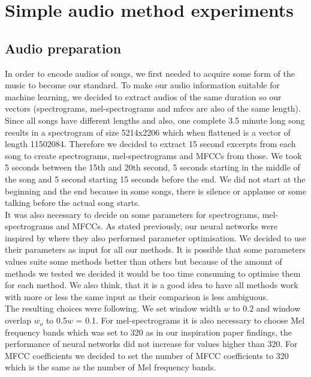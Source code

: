 \section{Simple audio method experiments}

\subsection{Audio preparation}\label{ssec:audio_prep}

In order to encode audios of songs, we first needed to acquire some form of the music to become our standard. To make our audio information suitable for machine learning, we decided to extract audios of the same duration so our vectors (spectrograms, mel-spectrograms and mfccs are also of the same length). Since all songs have different lengths and also, one complete 3.5 minute long song results in a spectrogram of size 5214x2206 which when flattened is a vector of length 11502084. Therefore we decided to extract 15 second excerpts from each song to create spectrograms, mel-spectrograms and MFCCs from those. We took 5 seconds between the 15th and 20th second, 5 seconds starting in the middle of the song and 5 second starting 15 seconds before the end. We did not start at the beginning and the end because in some songs, there is silence or applause or some talking before the actual song starts. \\

It was also necessary to decide on some parameters for spectrograms, mel-spectrograms and MFCCs. As stated previously, our neural networks were inspired by \cite{inproceedings_RNNs} where they also performed parameter optimisation. We decided to use their parameters as input for all our methods. It is possible that some parameters values suite some methods better than others but because of the amount of methods we tested we decided it would be too time consuming to optimise them for each method. We also think, that it is a good idea to have all methods work with more or less the same input as their comparison is less ambiguous. \\
The resulting choices were following. We set window width $w$ to 0.2 and window overlap $w_o$ to 0.5$w$ = 0.1. For mel-spectrograms it is also necessary to choose Mel frequency bands which was set to 320 as in our inspiration paper findings, the performance of neural networks did not increase for values higher than 320. For MFCC coefficients we decided to set the number of MFCC coefficients to 320 which is the same as the number of Mel frequency bands.


